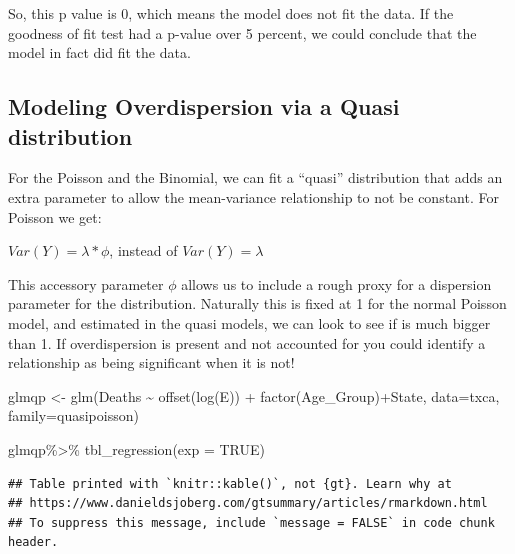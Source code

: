\documentclass[
]{article}
\newenvironment{Shaded}{\begin{snugshade}}{\end{snugshade}}
\newcommand{\AttributeTok}[1]{\textcolor[rgb]{0.77,0.63,0.00}{#1}}
\newcommand{\ConstantTok}[1]{\textcolor[rgb]{0.00,0.00,0.00}{#1}}
\newcommand{\FunctionTok}[1]{\textcolor[rgb]{0.00,0.00,0.00}{#1}}
\newcommand{\NormalTok}[1]{#1}
\newcommand{\OtherTok}[1]{\textcolor[rgb]{0.56,0.35,0.01}{#1}}
\newcommand{\SpecialCharTok}[1]{\textcolor[rgb]{0.00,0.00,0.00}{#1}}
\begin{document}
So, this p value is 0, which means the model does not fit the data. If the goodness of fit test had a p-value over 5 percent, we could conclude that the model in fact did fit the data.

\hypertarget{modeling-overdispersion-via-a-quasi-distribution}{%
\subsection{Modeling Overdispersion via a Quasi distribution}\label{modeling-overdispersion-via-a-quasi-distribution}}

For the Poisson and the Binomial, we can fit a ``quasi'' distribution that adds an extra parameter to allow the mean-variance relationship to not be constant. For Poisson we get:

\(Var(Y) = \lambda * \phi\), instead of \(Var(Y) = \lambda\)

This accessory parameter \(\phi\) allows us to include a rough proxy for a dispersion parameter for the distribution. Naturally this is fixed at 1 for the normal Poisson model, and estimated in the quasi models, we can look to see if is much bigger than 1. If overdispersion is present and not accounted for you could identify a relationship as being significant when it is not!

\begin{Shaded}
\begin{Highlighting}[]
\NormalTok{glmqp }\OtherTok{\textless{}{-}} \FunctionTok{glm}\NormalTok{(Deaths }\SpecialCharTok{\textasciitilde{}} \FunctionTok{offset}\NormalTok{(}\FunctionTok{log}\NormalTok{(E)) }\SpecialCharTok{+} \FunctionTok{factor}\NormalTok{(Age\_Group)}\SpecialCharTok{+}\NormalTok{State,}
              \AttributeTok{data=}\NormalTok{txca,}
              \AttributeTok{family=}\NormalTok{quasipoisson)}

\NormalTok{glmqp}\SpecialCharTok{\%\textgreater{}\%}
  \FunctionTok{tbl\_regression}\NormalTok{(}\AttributeTok{exp =} \ConstantTok{TRUE}\NormalTok{)}
\end{Highlighting}
\end{Shaded}

\begin{verbatim}
## Table printed with `knitr::kable()`, not {gt}. Learn why at
## https://www.danieldsjoberg.com/gtsummary/articles/rmarkdown.html
## To suppress this message, include `message = FALSE` in code chunk header.
\end{verbatim}
\end{document}
